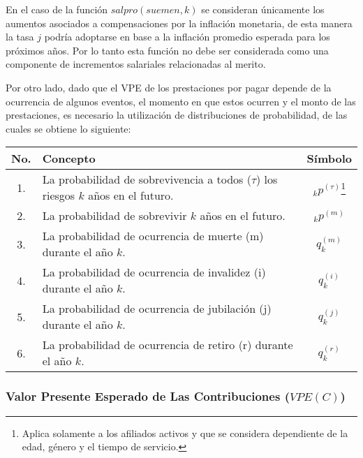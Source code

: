 \documentclass[12pt,letterpaper,titlepage]{article}
\begin{document}
{En el caso de la función $salpro(suemen,k)$ se consideran únicamente los aumentos asociados a compensaciones por la inflación monetaria, de esta manera la tasa $j$ podría adoptarse en base a la inflación promedio esperada para los próximos años. Por lo tanto esta función no debe ser considerada como una componente de incrementos salariales relacionadas al merito.

Por otro lado, dado que el VPE de los prestaciones por pagar depende de la ocurrencia de algunos eventos, el momento en que estos ocurren y el monto de las prestaciones, es necesario la utilización de distribuciones de probabilidad, de las cuales se obtiene lo siguiente:\\


\begin{center}
	\begin{minipage}[t]{360pt} %
	\begin{tabular}{|c||p{9cm}||c|}
	\hline 
	\rule[-1ex]{0pt}{2.5ex} No. & Concepto & Símbolo \\ 
	\hline 
	\hline 
	\rule[-1ex]{0pt}{2.5ex} 1. & La probabilidad de sobrevivencia a todos ($\tau$) los riesgos $k$ años en el futuro.  & $_{k}p^{(\tau)}$\footnote{Aplica solamente a los afiliados activos y que se considera dependiente de la edad, género y el tiempo de servicio.} \\ 
	\hline 
	\rule[-1ex]{0pt}{2.5ex} 2. & La probabilidad de sobrevivir $k$ años en el futuro. & $_{k}p^{(m)}$ \\ 		\hline 
	\rule[-1ex]{0pt}{2.5ex} 3. & La probabilidad de ocurrencia de muerte (m) durante el año $k$. & $q_{k}^{(m)}$ \\ 
	\hline 
	\rule[-1ex]{0pt}{2.5ex} 4. & La probabilidad de ocurrencia de invalidez (i) durante el año $k$. & $q_{k}^{(i)}$ \\ 
	\hline 
	\rule[-1ex]{0pt}{2.5ex} 5. & La probabilidad de ocurrencia de jubilación (j) durante el año $k$. & $q_{k}^{(j)}$ \\ 
	\hline 
	\rule[-1ex]{0pt}{2.5ex} 6. & La probabilidad de ocurrencia de retiro (r) durante el año $k$. & $q_{k}^{(r)}$ \\ 
	\hline 
\end{tabular} 
\end{minipage}
\end{center}


\subsubsection{Valor Presente Esperado de Las Contribuciones ($V\!PE(C)$)}

}
\end{document}
